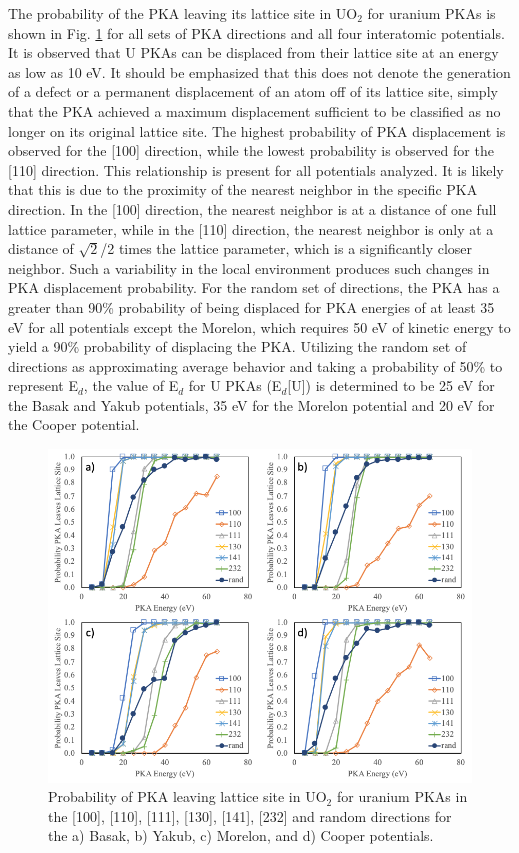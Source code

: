 \documentclass[review]{elsarticle}
\begin{document}
The probability of the PKA leaving its lattice site in UO$_2$ for uranium PKAs is shown in Fig. \ref{fig:pkau} for all sets of PKA directions and all four interatomic potentials. It is observed that U PKAs can be displaced from their lattice site at an energy as low as 10 eV. It should be emphasized that this does not denote the generation of a defect or a permanent displacement of an atom off of its lattice site, simply that the PKA achieved a maximum displacement sufficient to be classified as no longer on its original lattice site. The highest probability of PKA displacement is observed for the [100] direction, while the lowest probability is observed for the [110] direction. This relationship is present for all potentials analyzed. It is likely that this is due to the proximity of the nearest neighbor in the specific PKA direction. In the [100] direction, the nearest neighbor is at a distance of one full lattice parameter, while in the [110] direction, the nearest neighbor is only at a distance of $\sqrt{2}$/2 times the lattice parameter, which is a significantly closer neighbor. Such a variability in the local environment produces such changes in PKA displacement probability. For the random set of directions, the PKA has a greater than 90\% probability of being displaced for PKA energies of at least 35 eV for all potentials except the Morelon, which requires 50 eV of kinetic energy to yield a 90\% probability of displacing the PKA. Utilizing the random set of directions as approximating average behavior and taking a probability of 50\% to represent E$_d$, the value of E$_d$ for U PKAs (E$_d$[U]) is determined to be 25 eV for the Basak and Yakub potentials, 35 eV for the Morelon potential and 20 eV for the Cooper potential.

\begin{figure}[h]
 \centering
 \includegraphics[width=1.0\textwidth]{pka_Upka.png}
 \caption{Probability of PKA leaving lattice site in UO$_2$ for uranium PKAs in the [100], [110], [111], [130], [141], [232] and random directions for the a) Basak, b) Yakub, c) Morelon, and d) Cooper potentials. }
 \label{fig:pkau}
\end{figure}
\end{document}
